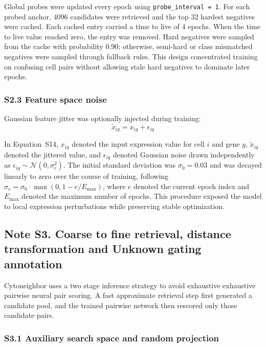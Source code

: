 \documentclass[11pt]{article}
\begin{document}
Global probes were updated every epoch using \texttt{probe\_interval = 1}. For each probed anchor, 4096 candidates were retrieved and the top 32 hardest negatives were cached. Each cached entry carried a time to live of 4 epochs. When the time to live value reached zero, the entry was removed. Hard negatives were sampled from the cache with probability 0.90; otherwise, semi-hard or class mismatched negatives were sampled through fallback rules. This design concentrated training on confusing cell pairs without allowing stale hard negatives to dominate later epochs.

\subsubsection*{S2.3 Feature space noise}

Gaussian feature jitter was optionally injected during training:
\begin{equation}
\tilde{x}_{ig} = x_{ig} + \epsilon_{ig}
\label{eq:feature_jitter}
\end{equation}

In Equation~S14, \(x_{ig}\) denoted the input expression value for cell \(i\) and gene \(g\), \(\tilde{x}_{ig}\) denoted the jittered value, and \(\epsilon_{ig}\) denoted Gaussian noise drawn independently as \(\epsilon_{ig} \sim \mathcal{N}(0,\sigma_e^2)\). The initial standard deviation was \(\sigma_0 = 0.03\) and was decayed linearly to zero over the course of training, following \(\sigma_e = \sigma_0 \cdot \max(0, 1 - e/E_{\max})\), where \(e\) denoted the current epoch index and \(E_{\max}\) denoted the maximum number of epochs. This procedure exposed the model to local expression perturbations while preserving stable optimization.

\subsection*{Note S3. Coarse to fine retrieval, distance transformation and Unknown gating annotation}

Cytoneighbor uses a two stage inference strategy to avoid exhaustive exhaustive pairwise neural pair scoring. A fast approximate retrieval step first generated a candidate pool, and the trained pairwise network then rescored only those candidate pairs.

\subsubsection*{S3.1 Auxiliary search space and random projection}
\end{document}
